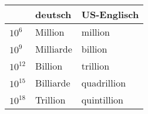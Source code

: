 \begin{tabular}{|l|l|l|} \hline
& deutsch   & US-Englisch \\ \hline \hline
$10^6$    & Million   & million     \\ \hline
$10^9$    & Milliarde & billion     \\ \hline
$10^{12}$ & Billion   & trillion    \\ \hline
$10^{15}$ & Billiarde & quadrillion \\ \hline
$10^{18}$ & Trillion  & quintillion \\ \hline
\end{tabular}